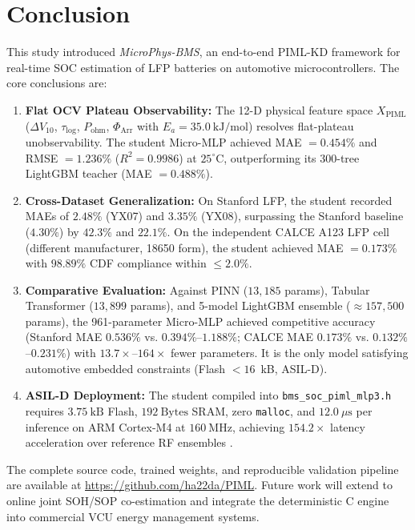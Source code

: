 \section{Conclusion}
\label{sec:conclusion}

This study introduced \textit{MicroPhys-BMS}, an end-to-end PIML-KD framework for real-time SOC estimation of LFP batteries on automotive microcontrollers. The core conclusions are:

\begin{enumerate}
	\item \textbf{Flat OCV Plateau Observability:} The 12-D physical feature space $X_{\text{PIML}}$ ($\Delta V_{10}$, $\tau_{\text{log}}$, $P_{\text{ohm}}$, $\Phi_{\text{Arr}}$ with $E_a = 35.0\ \text{kJ/mol}$) resolves flat-plateau unobservability. The student Micro-MLP achieved MAE $= 0.454\%$ and RMSE $= 1.236\%$ ($R^2 = 0.9986$) at $25^\circ\text{C}$, outperforming its 300-tree LightGBM teacher (MAE $= 0.488\%$).
	\item \textbf{Cross-Dataset Generalization:} On Stanford LFP, the student recorded MAEs of $2.48\%$ (YX07) and $3.35\%$ (YX08), surpassing the Stanford baseline ($4.30\%$) \cite{che2025enhanced} by $42.3\%$ and $22.1\%$. On the independent CALCE A123 LFP cell \cite{calce2014a123} (different manufacturer, 18650 form), the student achieved MAE $= 0.173\%$ with $98.89\%$ CDF compliance within $\le 2.0\%$.
	\item \textbf{Comparative Evaluation:} Against PINN \cite{karniadakis2021physics} ($13{,}185$ params), Tabular Transformer \cite{chen2024transformer} ($13{,}899$ params), and 5-model LightGBM ensemble \cite{ke2017lightgbm} ($\approx 157{,}500$ params), the 961-parameter Micro-MLP achieved competitive accuracy (Stanford MAE $0.536\%$ vs. $0.394\%$--$1.188\%$; CALCE MAE $0.173\%$ vs. $0.132\%$--$0.231\%$) with $13.7\times$--$164\times$ fewer parameters. It is the only model satisfying automotive embedded constraints (Flash $< 16$~kB, ASIL-D).
	\item \textbf{ASIL-D Deployment:} The student compiled into \texttt{bms\_soc\_piml\_mlp3.h} requires $3.75\ \text{kB}$ Flash, $192\ \text{Bytes}$ SRAM, zero \texttt{malloc}, and $12.0\ \mu\text{s}$ per inference on ARM Cortex-M4 at $160\ \text{MHz}$, achieving $154.2\times$ latency acceleration over reference RF ensembles \cite{yahyaei2023embedded}.
\end{enumerate}

The complete source code, trained weights, and reproducible validation pipeline are available at \url{https://github.com/ha22da/PIML}. Future work will extend to online joint SOH/SOP co-estimation and integrate the deterministic C engine into commercial VCU energy management systems.
